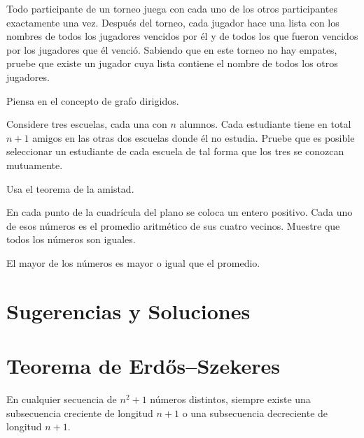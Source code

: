 \documentclass[11pt]{scrartcl}
\begin{document}
\begin{problem}
    Todo participante de un torneo juega con cada uno de los otros participantes exactamente una vez. Después del torneo, cada jugador hace una lista con los nombres de todos los jugadores vencidos por él y de todos los que fueron vencidos por los jugadores que él venció. Sabiendo que en este torneo no hay empates, pruebe que existe un jugador cuya lista contiene el nombre de todos los otros jugadores.
    \begin{hint}
    Piensa en el concepto de grafo dirigidos.
    \end{hint}
\end{problem}

\begin{problem}
    Considere tres escuelas, cada una con \(n\) alumnos. Cada estudiante tiene en total \(n + 1\) amigos en las otras dos escuelas donde él no estudia. Pruebe que es posible seleccionar un estudiante de cada escuela de tal forma que los tres se conozcan mutuamente.
    \begin{hint}
    Usa el teorema de la amistad.
    \end{hint}
\end{problem}

\begin{problem}
    En cada punto de la cuadrícula del plano se coloca un entero positivo. Cada uno de esos números es el promedio aritmético de sus cuatro vecinos. Muestre que todos los números son iguales.
    \begin{hint}
    El mayor de los números es mayor o igual que el promedio.
    \end{hint}
\end{problem}


\section{Sugerencias y Soluciones}
\begin{enumerate}

\end{enumerate}

\section*{Teorema de Erdős–Szekeres}

\begin{theorem}
En cualquier secuencia de \(n^2 + 1\) números distintos, siempre existe una subsecuencia creciente de longitud \(n + 1\) o una subsecuencia decreciente de longitud \(n + 1\).
\end{theorem}
\end{document}
